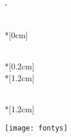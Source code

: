\thispagestyle{empty}             %
\calccentering{\unitlength}
\begin{adjustwidth*}{\unitlength}{-\unitlength}
    \begin{adjustwidth}{-0.5cm}{-0.5cm}
        \sffamily
        \begin{flushright}
            \thesistypeabbr{} \\*[0cm]
            \thesistype{}\\
        \end{flushright}
        \vspace*{\fill}
        \noindent
        \HUGE \thesistitle{}\\*[0.2cm]
        \Huge \thesissubtitle{}\\*[1.2cm]
        \parbox[b]{0.5\linewidth}{%
            \LARGE
            \thesisauthor{}\\*[1.2cm]
            \Large
            \thesislocation{} \the\year
        }
        \hfill\texttt{[image: fontys]}
    \end{adjustwidth}
\end{adjustwidth*}
\normalfont
\normalsize
